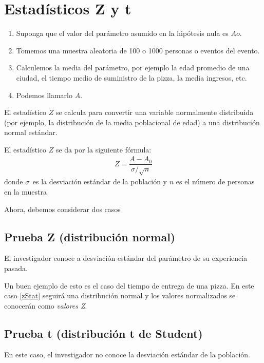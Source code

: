 \section{Estadísticos Z y t}

\begin{enumerate}
	\item Suponga que el valor del parámetro asumido en la hipótesis nula es $Ao$. 
	\item Tomemos
	una muestra aleatoria de 100 o 1000 personas o eventos del evento. 
	\item Calculemos
	la media del parámetro, por ejemplo la edad promedio de una ciudad, el tiempo medio de suministro de la pizza, la media
	ingresos, etc. 
	\item Podemos llamarlo $A$.
\end{enumerate}




El estadístico $Z$ se calcula para convertir una variable normalmente distribuida (por ejemplo, la distribución de la media poblacional de edad) a una distribución normal estándar.


El estadístico $Z$ se da por la siguiente fórmula:
\begin{align}
	\label{zStat}
	Z=\dfrac{A-A_{0}}{{\sigma}/{\sqrt{n}}}
\end{align}
donde $\sigma$ es la desviación estándar de la población y $n$ es el número de personas en la muestra


Ahora, debemos considerar dos casos

\subsection{Prueba Z (distribución normal)}
El investigador conoce a desviación estándar del parámetro de su experiencia pasada.



Un buen ejemplo de esto es el caso del tiempo de entrega de una pizza.  En este caso \eqref{zStat} seguirá una distribución normal y los valores normalizados se conocerán como \emph{valores Z}.

\subsection{Prueba t (distribución t de Student) }
En este caso, el investigador no conoce la desviación estándar de la población.



